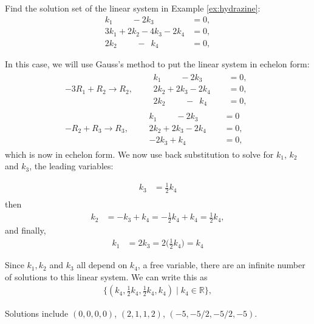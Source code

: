 \begin{example}
Find the solution set of the linear system in Example \ref{ex:hydrazine}:
\begin{align*}
k_1\phantom{+2k_2}-2k_3\phantom{+2k_4} & = 0, \\
3k_1+2k_2-4k_3-2k_4 & = 0, \\
2k_2\phantom{+2x_3}-\phantom{2}k_4 & = 0,
\end{align*}

\solution

In this case, we will use Gauss's method to put the linear system in echelon form:
%
\begin{align*}
-3R_1 +R_2 \rightarrow R_2,  \qquad
\begin{split}
k_1 \phantom{+2k_2}- 2k_3\phantom{+2k_4} & = 0, \\
2k_2 + 2k_3 -2k_4 & = 0, \\
2k_2\phantom{+2x_3}-\phantom{2}k_4 & = 0,
\end{split} \\[12pt]
-R_2 + R_3 \rightarrow R_3, \qquad
\begin{split}
k_1 \phantom{+2k_2}- 2k_3\phantom{+2k_4} & = 0\\
2k_2 + 2k_3 -2k_4 & = 0, \\
-2k_3 + k_4 & = 0,
\end{split} 
\end{align*}
which is now in echelon form.  We now use back substitution to solve for $k_1$, $k_2$ and $k_3$, the leading variables:

%
\begin{align*}
k_3 & = \frac{1}{2} k_4 \\
\end{align*}
then 
\begin{align*}
k_2 & = -k_3 + k_4 = - \frac{1}{2} k_4 + k_4 = \frac{1}{2} k_4, 
\end{align*}
and finally,
\begin{align*}
k_1 & = 2k_3 = 2 \biggl( \frac{1}{2} k_4 \biggr) = k_4
\end{align*}

Since $k_1, k_2$ and $k_3$ all depend on $k_4$, a free variable, there are an infinite number of solutions to this linear system.   We can write this as
%
\begin{align*}
\{ (k_4, \frac{1}{2} k_4, \frac{1}{2} k_4, k_4) \; | \; k_4 \in \mathbb{R} \}, 
\end{align*}

Solutions include $(0,0,0,0)$, $(2,1,1,2)$, $(-5,-5/2,-5/2,-5)$. 

\end{example}

